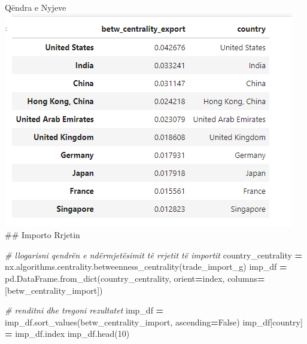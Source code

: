 \documentclass[
  ignorenonframetext,
]{beamer}
\newenvironment{Shaded}{\begin{snugshade}}{\end{snugshade}}
\newcommand{\CommentTok}[1]{\textcolor[rgb]{0.56,0.35,0.01}{\textit{#1}}}
\newcommand{\DecValTok}[1]{\textcolor[rgb]{0.00,0.00,0.81}{#1}}
\newcommand{\NormalTok}[1]{#1}
\newcommand{\OperatorTok}[1]{\textcolor[rgb]{0.81,0.36,0.00}{\textbf{#1}}}
\newcommand{\StringTok}[1]{\textcolor[rgb]{0.31,0.60,0.02}{#1}}
\newcommand{\VariableTok}[1]{\textcolor[rgb]{0.00,0.00,0.00}{#1}}
\begin{document}
\begin{frame}[fragile]{Qëndra e Nyjeve}
\protect\hypertarget{quxebndra-e-nyjeve-2}{}
\includegraphics{./Figs/qnyje.png} \#\# Importo Rrjetin


\begin{Shaded}
\begin{Highlighting}[]
\CommentTok{\# llogarisni qendrën e ndërmjetësimit të rrjetit të importit}
\NormalTok{country\_centrality }\OperatorTok{=}\NormalTok{ nx.algorithms.centrality.betweenness\_centrality(trade\_import\_g)}
\NormalTok{imp\_df }\OperatorTok{=}\NormalTok{ pd.DataFrame.from\_dict(country\_centrality, }
\NormalTok{                            orient}\OperatorTok{=}\StringTok{\textquotesingle{}index\textquotesingle{}}\NormalTok{, columns}\OperatorTok{=}\NormalTok{[}\StringTok{\textquotesingle{}betw\_centrality\_import\textquotesingle{}}\NormalTok{])}

\CommentTok{\# renditni dhe tregoni rezultatet}
\NormalTok{imp\_df }\OperatorTok{=}\NormalTok{ imp\_df.sort\_values(}\StringTok{\textquotesingle{}betw\_centrality\_import\textquotesingle{}}\NormalTok{, ascending}\OperatorTok{=}\VariableTok{False}\NormalTok{)}
\NormalTok{imp\_df[}\StringTok{\textquotesingle{}country\textquotesingle{}}\NormalTok{] }\OperatorTok{=}\NormalTok{ imp\_df.index}
\NormalTok{imp\_df.head(}\DecValTok{10}\NormalTok{)}
\end{Highlighting}
\end{Shaded}
\end{frame}
\end{document}
